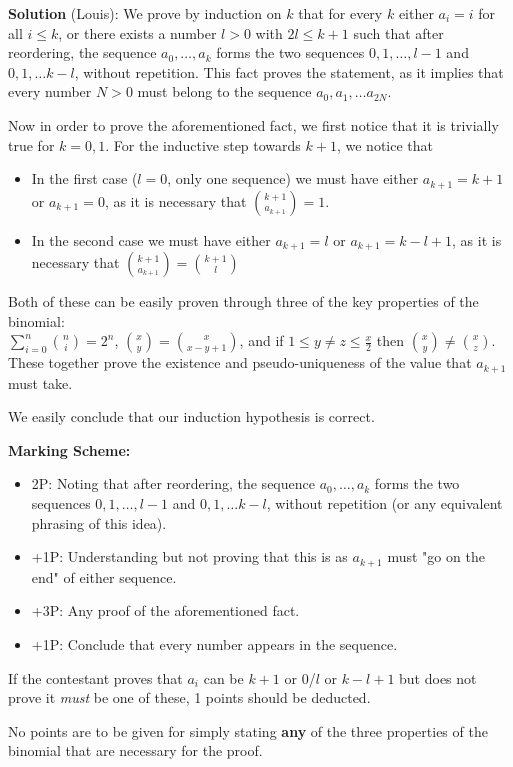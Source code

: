 
\textbf{Solution} (Louis):
We prove by induction on $k$ that for every $k$ either $a_i = i$ for all $i\leq k$, or there exists a number $l > 0$ with $2l \leq k+1$ such that after reordering, the sequence $a_0, \ldots, a_k$ forms the two sequences $0, 1, \ldots, l-1$ and $0, 1, \ldots k-l$, without repetition. This fact proves the statement, as it implies that every number $N > 0$ must belong to the sequence $a_0, a_1, \ldots a_{2N}$.

Now in order to prove the aforementioned fact, we first notice that it is trivially true for $k = 0, 1$. For the inductive step towards $k+1$, we notice that 
\begin{itemize}
    \item In the first case ($l = 0$, only one sequence) we must have either $a_{k+1} = k+1$ or $a_{k+1} = 0$, as it is necessary that $\binom{k+1}{a_{k+1}} = 1.$
    \item In the second case we must have either $a_{k+1} = l$ or $a_{k+1} = k-l+1$, as it is necessary that $\binom{k+1}{a_{k+1}} = \binom{k+1}{l}$
\end{itemize}
Both of these can be easily proven through three of the key properties of the binomial:\\ $\sum_{i=0}^n \binom{n}{i} = 2^n$, $\binom{x}{y} = \binom{x}{x-y+1}$, and if $1 \le y \neq z \le \frac{x}{2}$ then $\binom{x}{y} \neq \binom{x}{z}$. These together prove the existence and pseudo-uniqueness of the value that $a_{k+1}$ must take.

We easily conclude that our induction hypothesis is correct.

\textbf{Marking Scheme:} \\
\begin{itemize}
    \item 2P: Noting that after reordering, the sequence $a_0, \ldots, a_k$ forms the two sequences $0, 1, \ldots, l-1$ and $0, 1, \ldots k-l$, without repetition (or any equivalent phrasing of this idea).
    \item +1P: Understanding but not proving that this is as $a_{k+1}$ must "go on the end" of either sequence.
    \item +3P: Any proof of the aforementioned fact.
    \item +1P: Conclude that every number appears in the sequence.
\end{itemize}

If the contestant proves that $a_i$ can be $k+1$ or $0$/$l$ or $k-l+1$ but does not prove it \emph{must} be one of these, 1 points should be deducted. 



No points are to be given for simply stating \textbf{any} of the three properties of the binomial that are necessary for the proof.